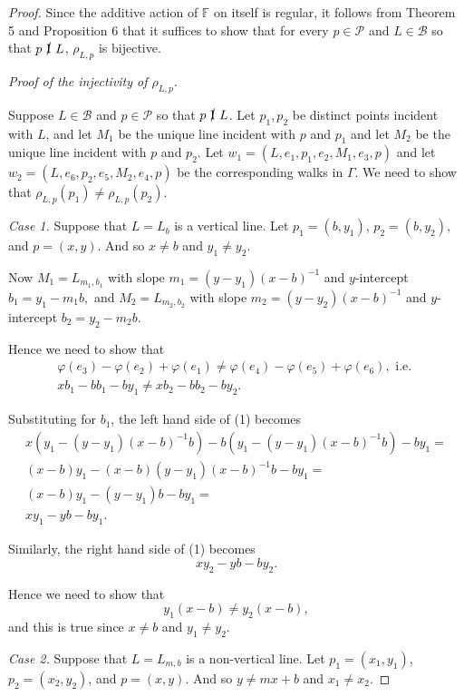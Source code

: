 \documentclass[11pt]{article}
\theoremstyle{definition}
\begin{document}
\begin{proof}
Since the additive action of $\mathbb{F}$ on itself is regular, it follows from Theorem 5 and Proposition 6 that it suffices to show that for every $p \in \mathscr{P}$ and $L \in \mathscr{B}$ so that $p \ \cancel{\mathrm{I}} \ L$, $\rho_{L,p}$ is bijective. 

\textit{Proof of the injectivity of $\rho_{L,p}$.}

Suppose $L \in \mathscr{B}$ and $p \in \mathscr{P}$ so that $p \ \cancel{\mathrm{I}} \ L$.  Let $p_1,p_2$ be distinct points incident with $L$, and let $M_1$ be the unique line incident with $p$ and $p_1$ and let $M_2$ be the unique line incident with $p$ and $p_2$.  Let $w_1 = (L,e_1,p_1,e_2,M_1,e_3,p)$ and let $w_2 = (L,e_6,p_2,e_5,M_2,e_4,p)$ be the corresponding walks in $\Gamma$.  We need to show that $\rho_{L,p}(p_1) \neq \rho_{L,p}(p_2)$.

\textit{Case 1.}  Suppose that $L = L_b$ is a vertical line.  Let $p_1 = (b,y_1)$, $p_2 = (b,y_2)$, and $p = (x,y)$.  And so $x \neq b$ and $y_1 \neq y_2$.

Now $M_1 = L_{m_1,b_1}$ with slope $m_1 = (y-y_1)(x-b)^{-1}$ and $y$-intercept $b_1 = y_1 - m_1 b,$ and $M_2 = L_{m_2,b_2}$ with slope $m_2 = (y-y_2)(x-b)^{-1}$ and $y$-intercept $b_2 = y_2 - m_2 b.$

Hence we need to show that 
\begin{gather}
\nonumber \varphi(e_3) - \varphi(e_2) + \varphi(e_1) \neq  \varphi(e_4) - \varphi(e_5) + \varphi(e_6), \text{  i.e.  } \\
xb_1 - bb_1 - by_1 \neq xb_2 - bb_2 - by_2.
\end{gather}

Substituting for $b_1$, the left hand side of (1) becomes
\begin{gather*}
x(y_1 - (y-y_1)(x-b)^{-1}b) - b(y_1 - (y-y_1)(x-b)^{-1}b) - by_1 = \\
(x-b)y_1 - (x-b)(y-y_1)(x-b)^{-1}b - by_1 = \\
(x-b)y_1 - (y-y_1)b - by_1 = \\
xy_1 - yb - by_1.
\end{gather*}

Similarly, the right hand side of (1) becomes
$$xy_2 - yb - by_2.$$

Hence we need to show that
$$y_1(x - b) \neq y_2(x-b),$$
and this is true since $x \neq b$ and $y_1 \neq y_2$.

\textit{Case 2.}  Suppose that $L = L_{m,b}$ is a non-vertical line.  Let $p_1 = (x_1, y_1)$, $p_2 = (x_2, y_2)$, and $p = (x,y)$.  And so $y \neq mx + b$ and $x_1 \neq x_2$.


\end{proof}
\end{document}
